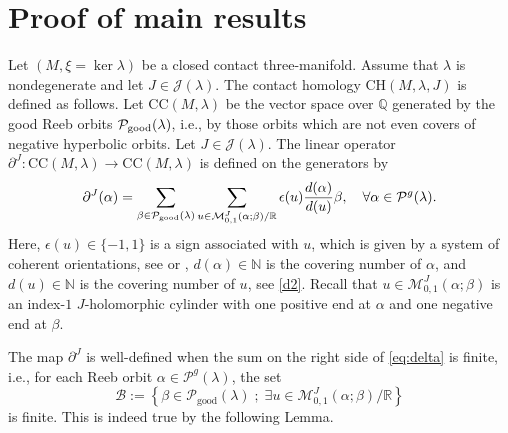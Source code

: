 \documentclass{amsart}
\newcommand{\R}{\mathbb{R}}
\newcommand{\Q}{\mathbb{Q}}
\newcommand{\N}{\mathbb{N}}
\newcommand{\M}{\mathcal{M}}
\begin{document}
\section{Proof of main results} \label{sec:homologia}
Let $(M, \xi = \ker \lambda)$ be a closed contact three-manifold. Assume that $\lambda$ is nondegenerate and let $J\in \mathcal J(\lambda)$. The contact homology $\text{CH}(M,\lambda, J)$ is defined as follows. Let $\text{CC}(M,\lambda)$ be the vector space over $\Q$ generated by the good Reeb orbits $\mathcal P_{\rm good}(\lambda)$, i.e., by those orbits which are not even covers of negative hyperbolic orbits. Let $J \in \mathcal{J}(\lambda)$. 
The linear operator $\partial^J:\text{CC}(M,\lambda) \to \text{CC}(M,\lambda)$ is defined on the generators by  
\begin{equation}
\partial^J(\alpha)=\sum_{\beta \in \mathcal{P}_{\rm good}(\lambda)} \sum_{u \in \M_{0,1}^{J} (\alpha;\beta)/\R} \epsilon(u) \frac{d(\alpha)}{d(u)}  \beta, \quad \forall \alpha \in \mathcal{P}^g(\lambda).
\label{eq:delta}
\end{equation}
Here, $ \epsilon(u) \in \{-1,1\}$ is a sign associated with $u$, which is given by a system of coherent orientations, see \cite{hutchings2009} or \cite{BM}, $d(\alpha) \in \N$ is the covering number of $\alpha$, and $d(u)\in \N$ is the covering number of $u$, see \eqref{d2}. Recall that $u\in \M_{0,1}^J(\alpha;\beta)$ is an index-$1$ $J$-holomorphic cylinder with one positive end at $\alpha$ and one negative end at $\beta$.

The map $\partial^J$ is well-defined when the sum on the right side of \eqref{eq:delta} is finite, i.e., for each Reeb orbit $\alpha \in \mathcal{P}^g(\lambda)$, the set
\begin{equation}\label{BB}
\mathcal{B}:=\left\{\beta \in \mathcal{P}_{\text{good}}(\lambda) \; ; \;  \exists u \in \M_{0,1}^{J}(\alpha; \beta)/\R \right\}
\end{equation}
is finite. This is indeed true by the following Lemma. 
\end{document}
